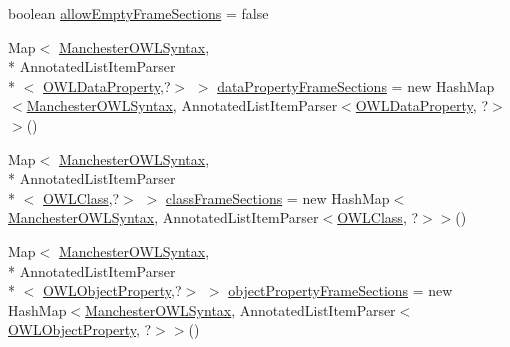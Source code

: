 \begin{DoxyCompactItemize}
\item 
boolean \hyperlink{classorg_1_1coode_1_1owlapi_1_1manchesterowlsyntax_1_1_manchester_o_w_l_syntax_editor_parser_a73b9f96a4fb79a88568ce36525f2d0a0}{allow\-Empty\-Frame\-Sections} = false
\item 
Map$<$ \hyperlink{enumorg_1_1coode_1_1owlapi_1_1manchesterowlsyntax_1_1_manchester_o_w_l_syntax}{Manchester\-O\-W\-L\-Syntax}, \\*
Annotated\-List\-Item\-Parser\\*
$<$ \hyperlink{interfaceorg_1_1semanticweb_1_1owlapi_1_1model_1_1_o_w_l_data_property}{O\-W\-L\-Data\-Property},?$>$ $>$ \hyperlink{classorg_1_1coode_1_1owlapi_1_1manchesterowlsyntax_1_1_manchester_o_w_l_syntax_editor_parser_ad9612615c35a841f7c2103727b717fd1}{data\-Property\-Frame\-Sections} = new Hash\-Map$<$\hyperlink{enumorg_1_1coode_1_1owlapi_1_1manchesterowlsyntax_1_1_manchester_o_w_l_syntax}{Manchester\-O\-W\-L\-Syntax}, Annotated\-List\-Item\-Parser$<$\hyperlink{interfaceorg_1_1semanticweb_1_1owlapi_1_1model_1_1_o_w_l_data_property}{O\-W\-L\-Data\-Property}, ?$>$$>$()
\item 
Map$<$ \hyperlink{enumorg_1_1coode_1_1owlapi_1_1manchesterowlsyntax_1_1_manchester_o_w_l_syntax}{Manchester\-O\-W\-L\-Syntax}, \\*
Annotated\-List\-Item\-Parser\\*
$<$ \hyperlink{interfaceorg_1_1semanticweb_1_1owlapi_1_1model_1_1_o_w_l_class}{O\-W\-L\-Class},?$>$ $>$ \hyperlink{classorg_1_1coode_1_1owlapi_1_1manchesterowlsyntax_1_1_manchester_o_w_l_syntax_editor_parser_a920447894a1c212b15821f1b4cae0866}{class\-Frame\-Sections} = new Hash\-Map$<$\hyperlink{enumorg_1_1coode_1_1owlapi_1_1manchesterowlsyntax_1_1_manchester_o_w_l_syntax}{Manchester\-O\-W\-L\-Syntax}, Annotated\-List\-Item\-Parser$<$\hyperlink{interfaceorg_1_1semanticweb_1_1owlapi_1_1model_1_1_o_w_l_class}{O\-W\-L\-Class}, ?$>$$>$()
\item 
Map$<$ \hyperlink{enumorg_1_1coode_1_1owlapi_1_1manchesterowlsyntax_1_1_manchester_o_w_l_syntax}{Manchester\-O\-W\-L\-Syntax}, \\*
Annotated\-List\-Item\-Parser\\*
$<$ \hyperlink{interfaceorg_1_1semanticweb_1_1owlapi_1_1model_1_1_o_w_l_object_property}{O\-W\-L\-Object\-Property},?$>$ $>$ \hyperlink{classorg_1_1coode_1_1owlapi_1_1manchesterowlsyntax_1_1_manchester_o_w_l_syntax_editor_parser_a10d9dc82e29ecb3f78368c9e0a891522}{object\-Property\-Frame\-Sections} = new Hash\-Map$<$\hyperlink{enumorg_1_1coode_1_1owlapi_1_1manchesterowlsyntax_1_1_manchester_o_w_l_syntax}{Manchester\-O\-W\-L\-Syntax}, Annotated\-List\-Item\-Parser$<$\hyperlink{interfaceorg_1_1semanticweb_1_1owlapi_1_1model_1_1_o_w_l_object_property}{O\-W\-L\-Object\-Property}, ?$>$$>$()
$$
\end{DoxyCompactItemize}
